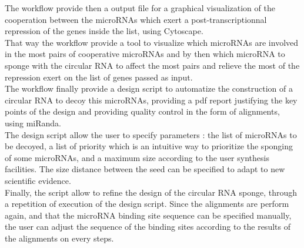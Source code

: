 \documentclass[a4paper,12pt]{report}
\begin{document}
The workflow provide then a output file for a graphical visualization of the cooperation between the microRNAs which exert a post-transcriptionnal repression of the genes inside the list, using Cytoscape\cite{cytoscape}.\\

That way the workflow provide a tool to visualize which microRNAs are involved in the most pairs of cooperative microRNAs and by then which microRNA to sponge with the circular RNA to affect the most pairs and relieve the most of the repression exert on the list of genes passed as input.\\

The workflow finally provide a design script to automatize the construction of a circular RNA to decoy this microRNAs, providing a pdf report justifying the key points of the design and providing quality control in the form of alignments, using miRanda.\\

The design script allow the user to specify parameters : the list of microRNAs to be decoyed, a list of priority which is an intuitive way to prioritize the sponging of some microRNAs, and a maximum size according to the user synthesis facilities. The size distance between the seed can be specified to adapt to new scientific evidence.\\

Finally, the script allow to refine the design of the circular RNA sponge, through a repetition of execution of the design script. Since the alignments are perform again, and that the microRNA binding site sequence can be specified manually, the user can adjust the sequence of the binding sites according to the results of the alignments on every steps.\\
\end{document}
